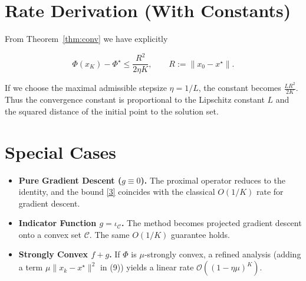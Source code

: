 \documentclass{article}
\begin{document}
\section*{Rate Derivation (With Constants)}

From Theorem~\ref{thm:conv} we have explicitly  

\[
\boxed{\;\Phi(x_K)-\Phi^\star\le \frac{R^2}{2\eta K},\qquad 
R:=\|x_0-x^\star\|.\;}
\]

If we choose the maximal admissible stepsize $\eta=1/L$, the constant becomes $\frac{L R^2}{2K}$. Thus the convergence constant is proportional to the Lipschitz constant $L$ and the squared distance of the initial point to the solution set.

\section*{Special Cases}

\begin{itemize}
  \item \textbf{Pure Gradient Descent ($g\equiv0$).} The proximal operator reduces to the identity, and the bound \eqref{3} coincides with the classical $O(1/K)$ rate for gradient descent.
  \item \textbf{Indicator Function $g=\iota_{\mathcal{C}}$.} The method becomes projected gradient descent onto a convex set $\mathcal{C}$. The same $O(1/K)$ guarantee holds.
  \item \textbf{Strongly Convex $f+g$.} If $\Phi$ is $\mu$‑strongly convex, a refined analysis (adding a term $\mu\|x_k-x^\star\|^2$ in (9)) yields a linear rate $\mathcal{O}((1-\eta\mu)^K)$.
\end{itemize}
\end{document}
